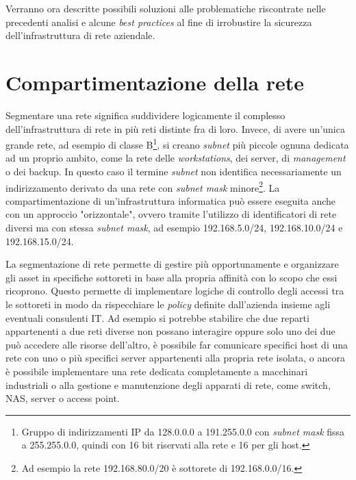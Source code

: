\documentclass[target=bach,aauheader=]{thud}
\begin{document}
Verranno ora descritte possibili soluzioni alle problematiche riscontrate nelle precedenti analisi e alcune \textit{best practices} al fine di irrobustire la sicurezza dell'infrastruttura di rete aziendale.

\section{Compartimentazione della rete}

Segmentare una rete significa suddividere logicamente il complesso dell'infrastruttura di rete in più reti distinte fra di loro. Invece, di avere un'unica grande rete, ad esempio di classe B\footnote{Gruppo di indirizzamenti IP da 128.0.0.0 a 191.255.0.0 con \textit{subnet mask} fissa a 255.255.0.0, quindi con 16 bit riservati alla rete e 16 per gli host.}, si creano \textit{subnet} più piccole ognuna dedicata ad un proprio ambito, come la rete delle \textit{workstations}, dei server, di \textit{management} o dei backup. In questo caso il termine \textit{subnet} non identifica necessariamente un indirizzamento derivato da una rete con \textit{subnet mask} minore\footnote{Ad esempio la rete 192.168.80.0/20 è sottorete di 192.168.0.0/16.}. La compartimentazione di un'infrastruttura informatica può essere eseguita anche con un approccio "orizzontale", ovvero tramite l'utilizzo di identificatori di rete diversi ma con stessa \textit{subnet mask}, ad esempio 192.168.5.0/24, 192.168.10.0/24 e 192.168.15.0/24.

La segmentazione di rete permette di gestire più opportunamente e organizzare gli asset in specifiche sottoreti in base alla propria affinità con lo scopo che essi ricoprono. Questo permette di implementare logiche di controllo degli accessi tra le sottoreti in modo da rispecchiare le \textit{policy} definite dall'azienda insieme agli eventuali consulenti IT. Ad esempio si potrebbe stabilire che due reparti appartenenti a due reti diverse non possano interagire oppure solo uno dei due può accedere alle risorse dell'altro, è possibile far comunicare specifici host di una rete con uno o più specifici server appartenenti alla propria rete isolata, o ancora è possibile implementare una rete dedicata completamente a macchinari industriali o alla gestione e manutenzione degli apparati di rete, come switch, NAS, server o access point.
\end{document}
